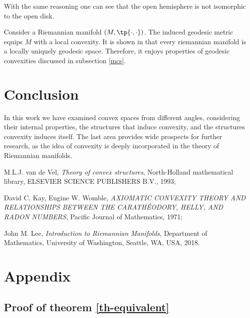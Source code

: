 \documentclass[12pt, a4paper]{article}
\begin{document}
\begin{remark}
    With the same reasoning one can see that the open hemisphere is not isomorphic to the open disk.
\end{remark}

\begin{observation}
    Consider a Riemannian manifold \((M, \tp{\cdot, \cdot})\). The induced geodesic metric equips \(M\) with a local convexity. It is shown in \cite{book3} that every riemannian manifold is a locally uniquely geodesic space. Therefore, it enjoys properties of geodesic convexities discussed in subsection \ref{mcs}.
\end{observation}



\section{Conclusion}

In this work we have examined convex spaces from different angles, considering their internal properties, the structures that induce convexity, and the structures convexity induces itself. The last area provides wide prospects for further research, as the idea of convexity is deeply incorporated in the theory of Riemannian manifolds.




\begin{thebibliography}{99}
     M.L.J. van de Vel, \textit{Theory of convex structures}, North-Holland mathematical library, ELSEVIER SCIENCE PUBLISHERS B.V., 1993;

     David C. Kay, Eugine W. Womble, \textit{AXIOMATIC CONVEXITY THEORY AND RELATIONSHIPS BETWEEN THE CARATH\'EODORY, HELLY, AND RADON NUMBERS}, Pacific Journal of Mathematics, 1971;

     John M. Lee, \textit{Introduction to Riemannian Manifolds}, Department of Mathematics, University of Washington, Seattle, WA, USA, 2018. %
\end{thebibliography}





\section{Appendix}

\subsection{Proof of theorem \ref{th-equivalent}} \label{ap-th-equivalent}
\end{document}
